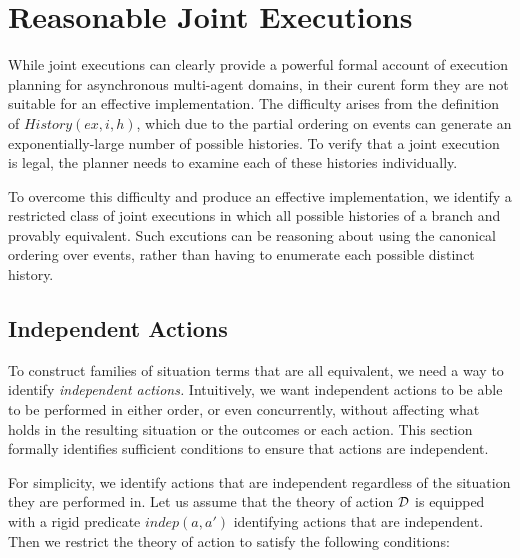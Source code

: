 \section{Reasonable Joint Executions\label{sec:JointExec:Reasonable}}

While joint executions can clearly provide a powerful formal account
of execution planning for asynchronous multi-agent domains, in their
curent form they are not suitable for an effective implementation.
The difficulty arises from the definition of $History(ex,i,h)$, which
due to the partial ordering on events can generate an exponentially-large
number of possible histories. To verify that a joint execution is
legal, the planner needs to examine each of these histories individually.

To overcome this difficulty and produce an effective implementation,
we identify a restricted class of joint executions in which all possible
histories of a branch and provably equivalent. Such excutions can
be reasoning about using the canonical ordering over events, rather
than having to enumerate each possible distinct history.


\subsection{Independent Actions}

To construct families of situation terms that are all equivalent,
we need a way to identify \emph{independent actions.} Intuitively,
we want independent actions to be able to be performed in either order,
or even concurrently, without affecting what holds in the resulting
situation or the outcomes or each action. This section formally identifies
sufficient conditions to ensure that actions are independent.

For simplicity, we identify actions that are independent regardless
of the situation they are performed in. Let us assume that the theory
of action $\mathcal{D}$ is equipped with a rigid predicate $indep(a,a')$
identifying actions that are independent. Then we restrict the theory
of action to satisfy the following conditions:

